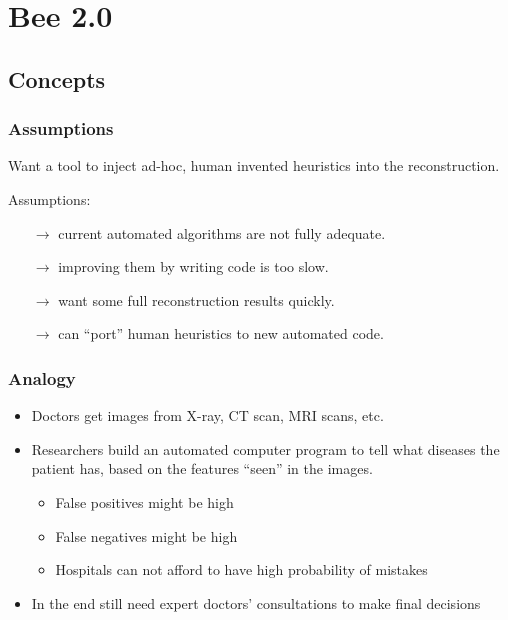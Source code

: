 \documentclass[xcolor=dvipsnames]{beamer}
\begin{document}




\section{Bee 2.0}

\subsection{Concepts}

\begin{frame}
  \frametitle{Assumptions}
  
  Want a tool to inject ad-hoc, human invented heuristics into the reconstruction.

  \vspace{3mm}
  Assumptions:
  \begin{itemize}
  \item[$\rightarrow$] current automated algorithms are not fully adequate.
  \item[$\rightarrow$] improving them by writing code is too slow.
  \item[$\rightarrow$] want some full reconstruction results quickly.
  \item[$\rightarrow$] can ``port'' human heuristics to new automated code.
  \end{itemize}

\end{frame}

\begin{frame}
  \frametitle{Analogy}
  \begin{itemize}
  \item Doctors get images from X-ray, CT scan, MRI
    scans, etc.
  \item Researchers build an automated computer
    program to tell what diseases the patient has,
    based on the features “seen” in the images.
    \begin{itemize}
    \item False positives might be high
    \item  False negatives might be high
    \item Hospitals can not afford to have high probability of
      mistakes
    \end{itemize}
  \item In the end still need expert doctors’ consultations
    to make final decisions
  \end{itemize}

\end{frame}
\end{document}
